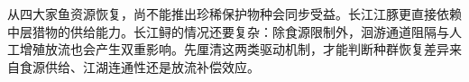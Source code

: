 从四大家鱼资源恢复，尚不能推出珍稀保护物种会同步受益。长江江豚更直接依赖中层猎物的供给能力。长江鲟的情况还要复杂：除食源限制外，洄游通道阻隔与人工增殖放流也会产生双重影响。先厘清这两类驱动机制，才能判断种群恢复差异来自食源供给、江湖连通性还是放流补偿效应。
